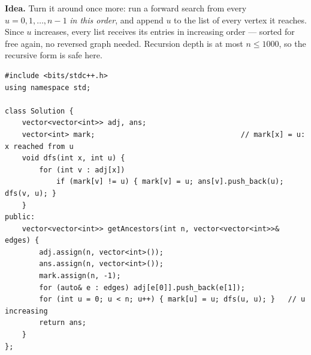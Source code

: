 \begin{alternativebox}
\textbf{Idea.} Turn it around once more: run a forward search from every $u = 0, 1, \dots, n-1$ \emph{in this order}, and append $u$ to the list of every vertex it reaches. Since $u$ increases, every list receives its entries in increasing order --- sorted for free again, no reversed graph needed. Recursion depth is at most $n \le 1000$, so the recursive form is safe here.

\begin{lstlisting}[style=cpp]
#include <bits/stdc++.h>
using namespace std;

class Solution {
    vector<vector<int>> adj, ans;
    vector<int> mark;                                  // mark[x] = u: x reached from u
    void dfs(int x, int u) {
        for (int v : adj[x])
            if (mark[v] != u) { mark[v] = u; ans[v].push_back(u); dfs(v, u); }
    }
public:
    vector<vector<int>> getAncestors(int n, vector<vector<int>>& edges) {
        adj.assign(n, vector<int>());
        ans.assign(n, vector<int>());
        mark.assign(n, -1);
        for (auto& e : edges) adj[e[0]].push_back(e[1]);
        for (int u = 0; u < n; u++) { mark[u] = u; dfs(u, u); }   // u increasing
        return ans;
    }
};
\end{lstlisting}

\begin{center}
\end{center}


\end{alternativebox}
